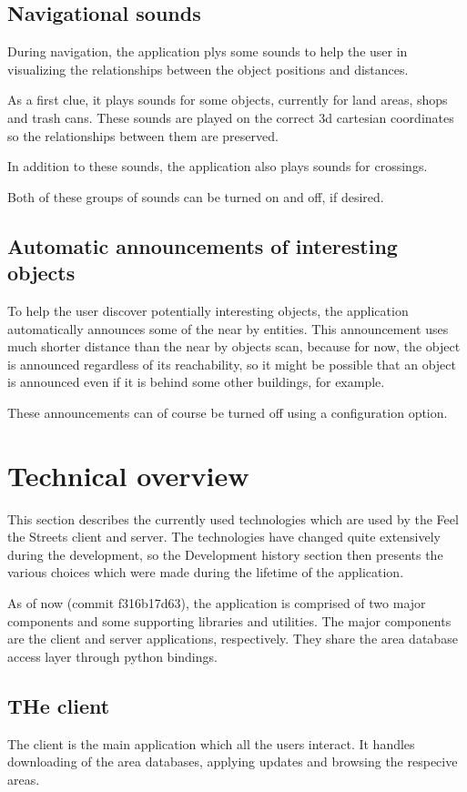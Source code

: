 \documentclass[nolof,digital]{fithesis3}
\begin{document}
\subsection{Navigational sounds}
During navigation, the application plys some sounds to help the user in visualizing the relationships between the object positions and distances.

As a first clue, it plays sounds for some objects, currently for land areas, shops and trash cans. These sounds are played on the correct 3d cartesian coordinates so the relationships between them are preserved.

In addition to these sounds, the application also plays sounds for crossings.

Both of these groups of sounds can be turned on and off, if desired.
\subsection{Automatic announcements of interesting objects}
To help the user discover potentially interesting objects, the application automatically announces some of the near by entities. This announcement uses much shorter distance than the near by objects scan, because for now, the object is announced regardless of its reachability, so it might be possible that an object is announced even if it is behind some other buildings, for example.

These announcements can of course be turned off using a configuration option.
\section{Technical overview}
This section describes the currently used technologies which are used by the Feel the Streets client and server. The technologies have changed quite extensively during the development, so the Development history section then presents the various choices which were made during the lifetime of the application.

As of now (commit f316b17d63), the application is comprised of two major components and some supporting libraries and utilities. The major components are the client and server applications, respectively. They share the area database access layer through python bindings.
\subsection{THe client}
The client is the main application which all the users interact. It handles downloading of the area databases, applying updates and browsing the respecive areas.
\end{document}
